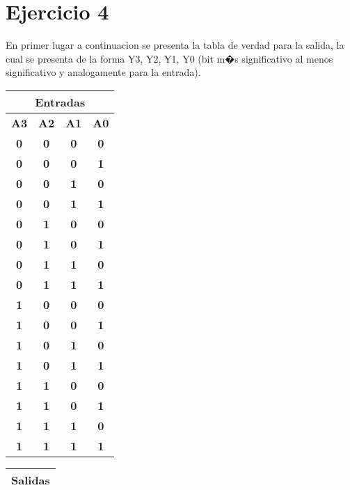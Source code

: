 
\section*{Ejercicio 4}
En primer lugar a continuacion se presenta la tabla de verdad para la salida, la cual se presenta de la forma Y3, Y2, Y1, Y0 (bit m�s significativo al menos significativo y analogamente para la entrada).
\begin{table}[htb] 
\centering  
\begin{tabular}{|c|c|c|c|}  
\hline  
\multicolumn{4}{|c|}{\textbf{Entradas}} \\ \hline  
\textbf{A3} & \textbf{A2} & \textbf{A1} & \textbf{A0} \\ \hline  
\textbf{0} & \textbf{0} & \textbf{0} & \textbf{0} \\ \hline  
\textbf{0} & \textbf{0} & \textbf{0} & \textbf{1} \\ \hline  
\textbf{0} & \textbf{0} & \textbf{1} & \textbf{0} \\ \hline  
\textbf{0} & \textbf{0} & \textbf{1} & \textbf{1} \\ \hline  
\textbf{0} & \textbf{1} & \textbf{0} & \textbf{0} \\ \hline  
\textbf{0} & \textbf{1} & \textbf{0} & \textbf{1} \\ \hline  
\textbf{0} & \textbf{1} & \textbf{1} & \textbf{0} \\ \hline  
\textbf{0} & \textbf{1} & \textbf{1} & \textbf{1} \\ \hline  
\textbf{1} & \textbf{0} & \textbf{0} & \textbf{0} \\ \hline  
\textbf{1} & \textbf{0} & \textbf{0} & \textbf{1} \\ \hline  
\textbf{1} & \textbf{0} & \textbf{1} & \textbf{0} \\ \hline  
\textbf{1} & \textbf{0} & \textbf{1} & \textbf{1} \\ \hline  
\textbf{1} & \textbf{1} & \textbf{0} & \textbf{0} \\ \hline  
\textbf{1} & \textbf{1} & \textbf{0} & \textbf{1} \\ \hline  
\textbf{1} & \textbf{1} & \textbf{1} & \textbf{0} \\ \hline  
\textbf{1} & \textbf{1} & \textbf{1} & \textbf{1} \\ \hline  
\end{tabular}  
\begin{tabular}{|c|c|c|c|} \hline 
\multicolumn{4}{|c|}{\textbf{Salidas}}                \\ \hline  

\end{tabular}
\end{table}
